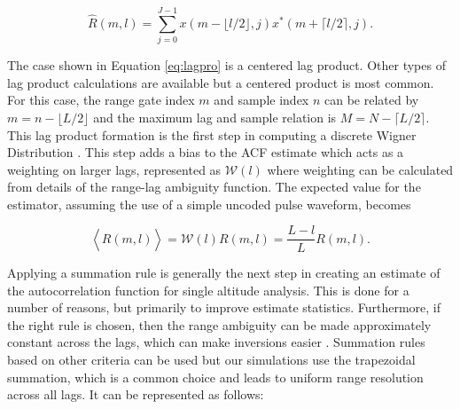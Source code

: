 \documentclass[draft,ras]{agutex}
\begin{document}
\begin{article}
\begin{equation}
\label{eq:lagpro}
\widehat{R}(m,l) = \displaystyle\sum\limits_{j=0}^{J-1} x(m-\lfloor l/2\rfloor,j)x^*(m+\lceil l/2 \rceil,j).
\end{equation}

The case shown in Equation \ref{eq:lagpro} is a centered lag product.  Other types of lag product calculations are available but a centered product is most common. For this case, the range gate index $m$ and sample index $n$ can be related by $m=n-\lfloor L/2\rfloor$ and the maximum lag and sample relation is $M=N-\lceil L/2 \rceil$.  This lag product formation is the first step in computing a discrete Wigner Distribution \citep{TFAcohen}. This  step adds a bias to the ACF estimate which acts as a weighting on larger lags, represented as $\mathcal{W}(l)$ where weighting can be calculated from details of the range-lag ambiguity function. The expected value for the estimator, assuming the use of a simple uncoded pulse waveform, becomes

\begin{equation}
\label{eq:lagprobias}
\left\langle\widehat{R}(m,l) \right\rangle = \mathcal{W}(l)R(m,l) =\frac{L-l}{L}R(m,l).
\end{equation}
%
%

Applying a summation rule is generally the next step in creating an estimate of the autocorrelation function for single altitude analysis. This is done for a number of reasons, but primarily to improve estimate statistics.  Furthermore, if the right rule is chosen, then the range ambiguity can be made approximately constant across the lags, which can make inversions easier \citep{nygren1996}. Summation rules based on other criteria can be used but our simulations use the trapezoidal summation, which is a common choice and leads to uniform range resolution across all lags. It can be represented as follows:


\end{article}
\end{document}
